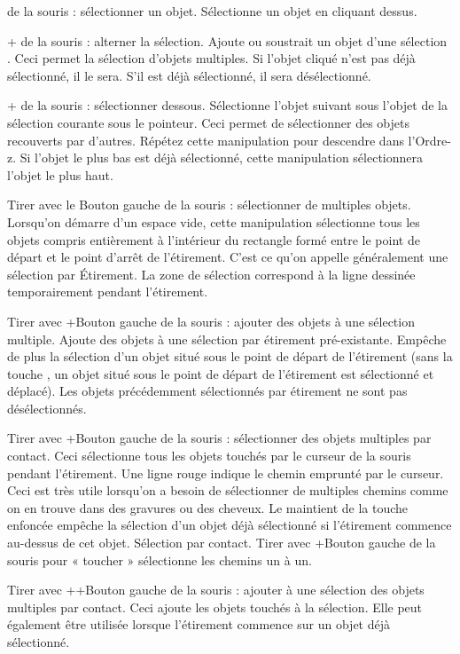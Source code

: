 \documentclass[a4paper,twoside]{article}
\begin{document}
 de la souris : sélectionner un objet. Sélectionne un objet en cliquant dessus.

+ de la souris : alterner la sélection. Ajoute ou soustrait un objet d'une sélection . Ceci permet la sélection d'objets multiples. Si l'objet cliqué n'est pas déjà sélectionné, il le sera. S'il est déjà sélectionné, il sera désélectionné.

+ de la souris : sélectionner dessous. Sélectionne l'objet suivant sous l'objet de la sélection courante sous le pointeur. Ceci permet de sélectionner des objets recouverts par d'autres. Répétez cette manipulation pour descendre dans l'Ordre-z. Si l'objet le plus bas est déjà sélectionné, cette manipulation sélectionnera l'objet le plus haut.

Tirer avec le Bouton gauche de la souris : sélectionner de multiples objets. Lorsqu'on démarre d'un espace vide, cette manipulation sélectionne tous les objets compris entièrement à l'intérieur du rectangle formé entre le point de départ et le point d'arrêt de l'étirement. C'est ce qu'on appelle généralement une sélection par Étirement. La zone de sélection correspond à la ligne dessinée temporairement pendant l'étirement.

Tirer avec +Bouton gauche de la souris : ajouter des objets à une sélection multiple. Ajoute des objets à une sélection par étirement pré-existante. Empêche de plus la sélection d'un objet situé sous le point de départ de l'étirement (sans la touche , un objet situé sous le point de départ de l'étirement est sélectionné et déplacé). Les objets précédemment sélectionnés par étirement ne sont pas désélectionnés.

Tirer avec +Bouton gauche de la souris : sélectionner des objets multiples par contact. Ceci sélectionne tous les objets touchés par le curseur de la souris pendant l'étirement. Une ligne rouge indique le chemin emprunté par le curseur. Ceci est très utile lorsqu'on a besoin de sélectionner de multiples chemins comme on en trouve dans des gravures ou des cheveux. Le maintient de la touche  enfoncée empêche la sélection d'un objet déjà sélectionné si l'étirement commence au-dessus de cet objet.
Sélection par contact.
Tirer avec +Bouton gauche de la souris pour « toucher » sélectionne les chemins un à un.

Tirer avec ++Bouton gauche de la souris : ajouter à une sélection des objets multiples par contact. Ceci ajoute les objets touchés à la sélection. Elle peut également être utilisée lorsque l'étirement commence sur un objet déjà sélectionné. 
\end{document}
